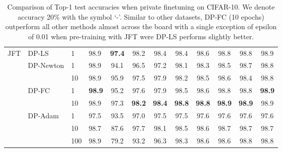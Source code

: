 \documentclass[letterpaper]{article} \usepackage{fullpage}
\begin{document}
\begin{table*}[!h]
\begin{tabular}{llll|cccccccc}
		\multirow{8}{*}{JFT} & \multirow{ 1}{*}{DP-LS}     & 1      & 98.9        & \textbf{97.4} & 98.2 & 98.4 & 98.4 & 98.6 & 98.8 & 98.8 & 98.9 \\ \addlinespace[0.1cm]
\addlinespace[0.1cm]
		                     & \multirow{ 2}{*}{DP-Newton} & 1      & 98.9        & 94.1 & 96.5 & 97.2 & 98.1 & 98.3 & 98.5 & 98.7 & 98.8 \\
		                     &                             & 10     & 98.9        & 95.9 & 97.5 & 97.9 & 98.2 & 98.5 & 98.6 & 98.4 & 98.8 \\
		\addlinespace[0.1cm]
\addlinespace[0.1cm]
		                     & \multirow{ 2}{*}{DP-FC}     & 1      & \textbf{98.9}        & 95.2 & 97.6 & 97.9 & 98.5 & 98.6 & 98.8 & 98.8 & \textbf{98.9} \\
		                     &                             & 10     & 98.9        & 97.3 & \textbf{98.2} & \textbf{98.4} & \textbf{98.8} & \textbf{98.8} & \textbf{98.9} & \textbf{98.9} & 98.9 \\
		\addlinespace[0.1cm]
\addlinespace[0.1cm]
		                     & \multirow{ 3}{*}{DP-Adam}   & 1      & 97.5        & 93.5 & 97.0 & 97.5 & 97.5 & 97.6 & 97.6 & 97.6 & 97.6 \\
		                     &                             & 10     & 98.7        & 87.6 & 97.7 & 98.1 & 98.5 & 98.6 & 98.7 & 98.7 & 98.7 \\ &                             & 100    & 98.9        & 79.2 & 93.2 & 96.3 & 98.3 & 98.6 & 98.6 & 98.8 & 98.8 \\ \bottomrule
	\end{tabular}
	\caption{Comparison of Top-1 test accuracies when private finetuning on CIFAR-10. We denote accuracy  20\% with the symbol `-'. Similar to other datasets, DP-FC (10 epochs) outperform all other methods almost across the board with a single exception of epsilon of 0.01 when pre-training with JFT were DP-LS performs slightly better.}
	\label{tab:cifar10}
\end{table*}
\end{document}
